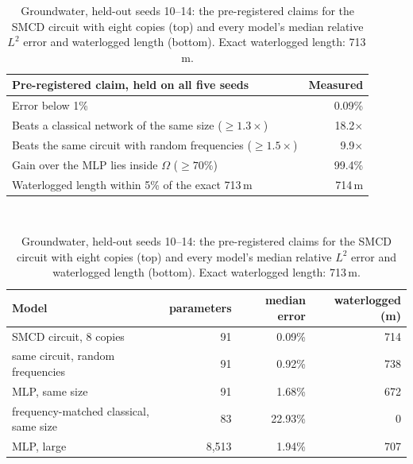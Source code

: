 \begin{table}[htbp]
  \centering
  \small
  \begin{tabular}{lr}
  \toprule
  Pre-registered claim, held on all five seeds & Measured \\
  \midrule
  Error below 1\% & 0.09\% \\
  Beats a classical network of the same size ($\ge1.3\times$) & 18.2$\times$ \\
  Beats the same circuit with random frequencies ($\ge1.5\times$) & 9.9$\times$ \\
  Gain over the MLP lies inside $\Omega$ ($\ge70\%$) & 99.4\% \\
  Waterlogged length within 5\% of the exact 713\,m & 714\,m \\
  \bottomrule
  \end{tabular}\\[8pt]
  \begin{tabular}{lrrr}
  \toprule
  Model & parameters & median error & waterlogged (m) \\
  \midrule
  SMCD circuit, 8 copies & 91 & 0.09\% & 714 \\
  same circuit, random frequencies & 91 & 0.92\% & 738 \\
  MLP, same size & 91 & 1.68\% & 672 \\
  frequency-matched classical, same size & 83 & 22.93\% & 0 \\
  MLP, large & 8{,}513 & 1.94\% & 707 \\
  \bottomrule
  \end{tabular}
  \caption{Groundwater, held-out seeds 10--14: the pre-registered claims for the SMCD
    circuit with eight copies (top) and every model's median relative $L^2$ error and
    waterlogged length (bottom). Exact waterlogged length: 713\,m.}
  \label{tab:gw}
\end{table}
